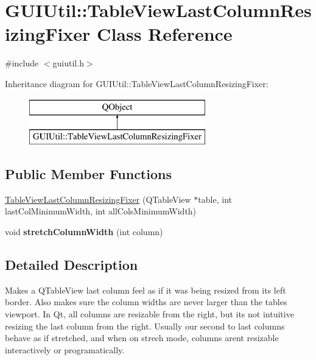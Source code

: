 \hypertarget{class_g_u_i_util_1_1_table_view_last_column_resizing_fixer}{}\section{G\+U\+I\+Util\+:\+:Table\+View\+Last\+Column\+Resizing\+Fixer Class Reference}
\label{class_g_u_i_util_1_1_table_view_last_column_resizing_fixer}


{\ttfamily \#include $<$guiutil.\+h$>$}

Inheritance diagram for G\+U\+I\+Util\+:\+:Table\+View\+Last\+Column\+Resizing\+Fixer\+:\begin{figure}[H]
\begin{center}
\leavevmode
\includegraphics[height=2.000000cm]{class_g_u_i_util_1_1_table_view_last_column_resizing_fixer}
\end{center}
\end{figure}
\subsection*{Public Member Functions}
\begin{DoxyCompactItemize}
\item 
\mbox{\hyperlink{class_g_u_i_util_1_1_table_view_last_column_resizing_fixer_a25687ab7a88da518b48d7355dc9aa22d}{Table\+View\+Last\+Column\+Resizing\+Fixer}} (Q\+Table\+View $\ast$table, int last\+Col\+Minimum\+Width, int all\+Cols\+Minimum\+Width)
\item 
\mbox{\label{class_g_u_i_util_1_1_table_view_last_column_resizing_fixer_a89971ed347cf9d25e02cfb7d9c7e3ca6}} 
void {\bfseries stretch\+Column\+Width} (int column)
\end{DoxyCompactItemize}


\subsection{Detailed Description}
Makes a Q\+Table\+View last column feel as if it was being resized from its left border. Also makes sure the column widths are never larger than the table\textquotesingle{}s viewport. In Qt, all columns are resizable from the right, but it\textquotesingle{}s not intuitive resizing the last column from the right. Usually our second to last columns behave as if stretched, and when on strech mode, columns aren\textquotesingle{}t resizable interactively or programatically.

